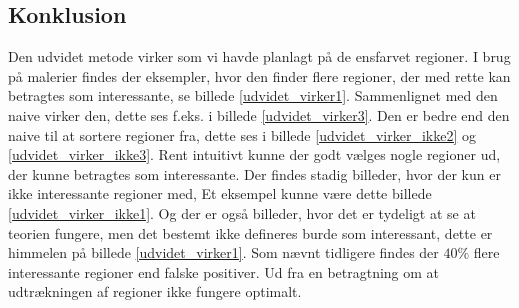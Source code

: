 \subsection{Konklusion}
Den udvidet metode virker som vi havde planlagt på de ensfarvet
regioner. I brug på malerier findes der eksempler, hvor den finder
flere regioner, der med rette kan betragtes som interessante, se billede
\ref{udvidet_virker1}. Sammenlignet med den naive virker den, dette ses
f.eks. i billede \ref{udvidet_virker3}. Den er bedre end den naive til
at sortere regioner fra, dette ses i billede \ref{udvidet_virker_ikke2}
og \ref{udvidet_virker_ikke3}. Rent intuitivt kunne der godt vælges
nogle regioner ud, der kunne betragtes som interessante. Der findes
stadig billeder, hvor der kun er ikke interessante regioner med, Et
eksempel kunne være dette billede \ref{udvidet_virker_ikke1}.
Og der er også billeder, hvor det er tydeligt at se at teorien fungere,
men det bestemt ikke defineres burde som interessant, dette er himmelen
på billede \ref{udvidet_virker1}. 
Som nævnt tidligere findes der $40\%$ flere interessante regioner end
falske positiver. Ud fra en betragtning om at udtrækningen af regioner
ikke fungere optimalt.

